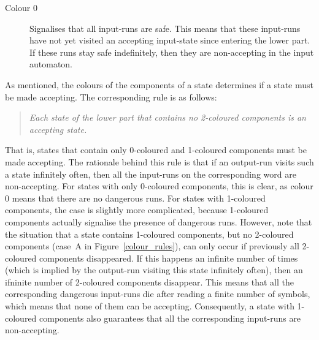{\begin{description}


\item[Colour 0]
Signalises that all input-runs are safe. This means that these input-runs have not yet visited an accepting input-state since entering the lower part. If these runs stay safe indefinitely, then they are non-accepting in the input automaton. 
\end{description}}

As mentioned, the colours of the components of a state determines if a state must be made accepting. The corresponding rule is as follows:

\begin{quote}
\centering
\textit{Each state of the lower part that contains no 2-coloured components is an accepting state.}
\end{quote}

That is, states that contain only 0-coloured and 1-coloured components must be made accepting. The rationale behind this rule is that if an output-run visits such a state infinitely often, then all the input-runs on the corresponding word are non-accepting. For states with only 0-coloured components, this is clear, as colour 0 means that there are no dangerous runs. For states with 1-coloured components, the case is slightly more complicated, because 1-coloured components actually signalise the presence of dangerous runs. However, note that the situation that a state contains 1-coloured components, but no 2-coloured components (case~A in Figure~\ref{colour_rules}), can only occur if previously all 2-coloured components disappeared. If this happens an infinite number of times (which is implied by the output-run visiting this state infinitely often), then an ifninite number of 2-coloured components disappear. This means that all the corresponding dangerous input-runs die after reading a finite number of symbols, which means that none of them can be accepting. Consequently, a state with 1-coloured components also guarantees that all the corresponding input-runs are non-accepting.

